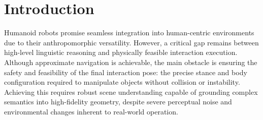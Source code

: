 \documentclass[conference]{IEEEtran}
\begin{document}







\section{Introduction}

Humanoid robots promise seamless integration into human-centric environments due to their anthropomorphic versatility. However, a critical gap remains between high-level linguistic reasoning and physically feasible interaction execution. Although approximate navigation is achievable, the main obstacle is ensuring the safety and feasibility of the final interaction pose: the precise stance and body configuration required to manipulate objects without collision or instability. Achieving this requires robust scene understanding capable of grounding complex semantics into high-fidelity geometry, despite severe perceptual noise and environmental changes inherent to real-world operation.
\end{document}
